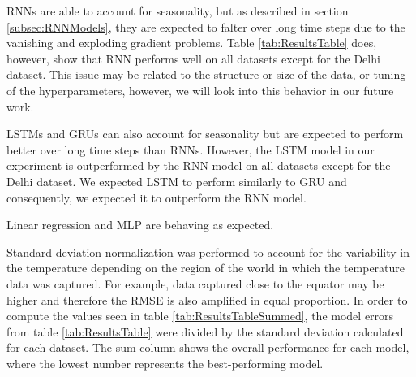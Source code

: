 RNNs are able to account for seasonality, but as described in section \ref{subsec:RNNModels}, they are expected to falter over long time steps due to the vanishing and exploding gradient problems. Table \ref{tab:ResultsTable} does, however, show that RNN performs well on all datasets except for the Delhi dataset. This issue may be related to the structure or size of the data, or tuning of the hyperparameters, however, we will look into this behavior in our future work.

LSTMs and GRUs can also account for seasonality but are expected to perform better over long time steps than RNNs. 
However, the LSTM model in our experiment is outperformed by the RNN model on all datasets except for the Delhi dataset.
We expected LSTM to perform similarly to GRU and consequently, we expected it to outperform the RNN model.

Linear regression and MLP are behaving as expected.

Standard deviation normalization was performed to account for the variability in the temperature depending on the region of the world in which the temperature data was captured. 
For example, data captured close to the equator may be higher and therefore the RMSE is also amplified in equal proportion. 
In order to compute the values seen in table \ref{tab:ResultsTableSummed}, the model errors from table \ref{tab:ResultsTable} were divided by the standard deviation calculated for each dataset.
The sum column shows the overall performance for each model, where the lowest number represents the best-performing model. 
